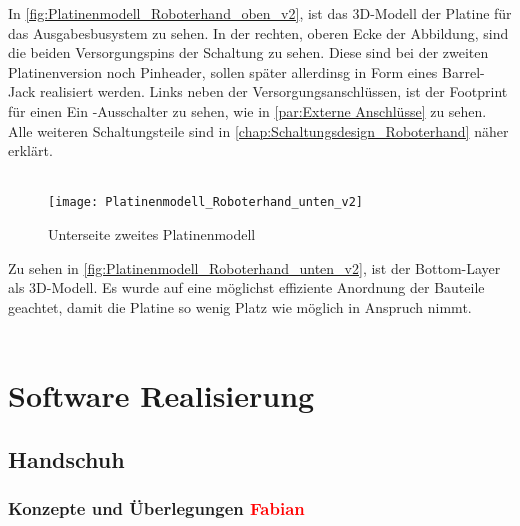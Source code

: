 \documentclass[titlepage,12pt,twoside]{article}
\begin{document}
\hfill \break
In \autoref{fig:Platinenmodell_Roboterhand_oben_v2}, ist das 3D-Modell der Platine für das Ausgabesbusystem zu sehen. In der rechten, oberen
Ecke der Abbildung, sind die beiden Versorgungspins der Schaltung zu sehen. Diese sind bei der zweiten Platinenversion noch Pinheader, sollen
später allerdinsg in Form eines Barrel-Jack realisiert werden. Links neben der Versorgungsanschlüssen, ist der Footprint für einen Ein -Ausschalter
zu sehen, wie in \autoref{par:Externe Anschlüsse} zu sehen. Alle weiteren Schaltungsteile sind in \autoref{chap:Schaltungsdesign_Roboterhand} näher
erklärt. \\
\\
\begin{figure}[H]
	\begin{center}
		\scalebox{0.8}
		{\texttt{[image: Platinenmodell\_Roboterhand\_unten\_v2]}}
		\caption{Unterseite zweites Platinenmodell}
		\label{fig:Platinenmodell_Roboterhand_unten_v2}		
	\end{center}
\end{figure}
\hfill \break
Zu sehen in \autoref{fig:Platinenmodell_Roboterhand_unten_v2}, ist der Bottom-Layer als 3D-Modell. Es wurde auf eine möglichst effiziente
Anordnung der Bauteile geachtet, damit die Platine so wenig Platz wie möglich in Anspruch nimmt. \\
\\
\newpage
\section{Software Realisierung}

\subsection{Handschuh}
\subsubsection{Konzepte und Überlegungen \textcolor{red}{Fabian}}
\end{document}
